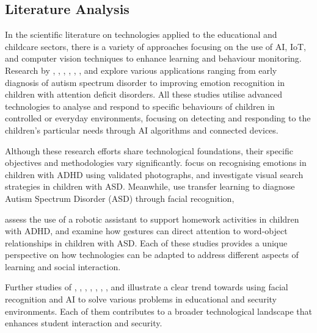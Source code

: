 \documentclass[a4paper,fleqn]{cas-sc}
\begin{document}
		\subsection{Literature Analysis}			
			In the scientific literature on technologies applied to the educational and childcare sectors, there is a variety of approaches focusing on the use of AI, IoT, and computer vision techniques to enhance learning and behaviour monitoring. Research by %
			\cite{Pelc2006},  %
			\cite{Albrecht2014}, %
			\cite{Warren2015Brief}, %
			\cite{Washington2016AWereable},%
			\cite{Akter2021},  %
			\cite{Berrezueta-Guzman2021}, and %
			\cite{VilliersRader2021}
			 explore various applications ranging from early diagnosis of autism spectrum disorder to improving emotion recognition in children with attention deficit disorders. All these studies utilise advanced technologies to analyse and respond to specific behaviours of children in controlled or everyday environments, focusing on detecting and responding to the children’s particular needs through AI algorithms and connected devices.
			
			Although these research efforts share technological foundations, their specific objectives and methodologies vary significantly. \cite{Pelc2006} focus on recognising emotions in children with ADHD using validated photographs, and %
			\cite{Albrecht2014} investigate visual search strategies in children with ASD. Meanwhile, %
			\cite{Akter2021} use transfer learning to diagnose Autism Spectrum Disorder (ASD) through facial recognition,
			 
			\cite{Berrezueta-Guzman2021} assess the use of a robotic assistant to support homework activities in children with ADHD, and  \cite{VilliersRader2021} examine how gestures can direct attention to word-object relationships in children with ASD. %
			Each of these studies provides a unique perspective on how technologies can be adapted to address different aspects of learning and social interaction.
			
			Further studies of %
			\cite{James2019}, %
			\cite{Hachad2020}, %
			\cite{Enadula2021} %
			\cite{Ozdamli2022}, %
			\cite{Kulkarni2023}, %
			\cite{Narkhede2023}, %
			\cite{Farsani2020}, %
			\cite{Boumiza2017}, %
			\cite{Muller2018ArchnSmile} %
			\cite{DaCosta2023} and %
			\cite{Kumar2024Zoom}  illustrate a clear trend towards using facial recognition and AI to solve various problems in educational and security environments. Each of them contributes to a broader technological landscape that enhances student interaction and security.
			
\end{document}
